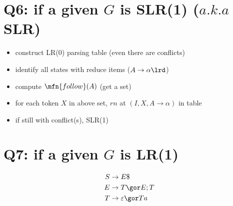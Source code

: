 \section*{Q6: if a given $G$ is SLR(1) ($a.k.a$ SLR)}
\begin{itemize}
\item construct LR(0) parsing table (even there are conflicts)
\item identify all states with reduce items ($A\to\alpha \lrd$)
\item compute $\mfn{follow}(A)$ (get a set)
\item for each token $X$ in above set, $rn$ at $(I,X, A\to\alpha)$ in table
\item if still with conflict(s),  SLR(1)
\end{itemize}
\section*{Q7: if a given $G$ is LR(1)}
\begin{minipage}{.5\linewidth}
\begin{align*}
  S&\to E\$ \\
  E&\to T \gor E;T \\
  T&\to \varepsilon \gor Ta
\end{align*}
\end{minipage}
\begin{minipage}{.5\linewidth}
  \centering
\end{minipage}
